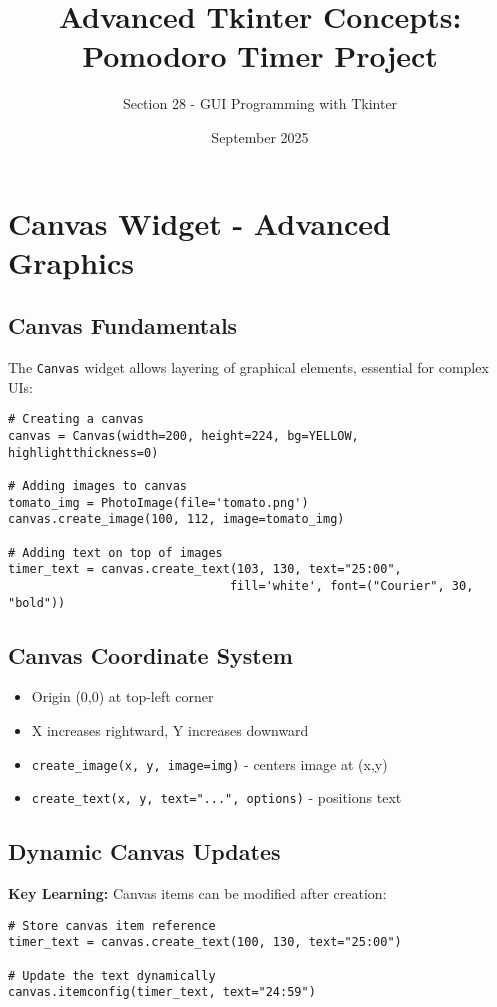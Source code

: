 \documentclass[12pt]{article}
\title{\textbf{Advanced Tkinter Concepts: Pomodoro Timer Project}}
\author{Section 28 - GUI Programming with Tkinter}
\date{September 2025}
\begin{document}
\maketitle

\section{Canvas Widget - Advanced Graphics}

\subsection{Canvas Fundamentals}
The \texttt{Canvas} widget allows layering of graphical elements, essential for complex UIs:

\begin{lstlisting}
# Creating a canvas
canvas = Canvas(width=200, height=224, bg=YELLOW, highlightthickness=0)

# Adding images to canvas
tomato_img = PhotoImage(file='tomato.png')
canvas.create_image(100, 112, image=tomato_img)

# Adding text on top of images
timer_text = canvas.create_text(103, 130, text="25:00", 
                               fill='white', font=("Courier", 30, "bold"))
\end{lstlisting}

\subsection{Canvas Coordinate System}
\begin{itemize}
    \item Origin (0,0) at top-left corner
    \item X increases rightward, Y increases downward
    \item \texttt{create\_image(x, y, image=img)} - centers image at (x,y)
    \item \texttt{create\_text(x, y, text="...", options)} - positions text
\end{itemize}

\subsection{Dynamic Canvas Updates}
\textbf{Key Learning:} Canvas items can be modified after creation:

\begin{lstlisting}
# Store canvas item reference
timer_text = canvas.create_text(100, 130, text="25:00")

# Update the text dynamically
canvas.itemconfig(timer_text, text="24:59")
\end{lstlisting}
\end{document}
